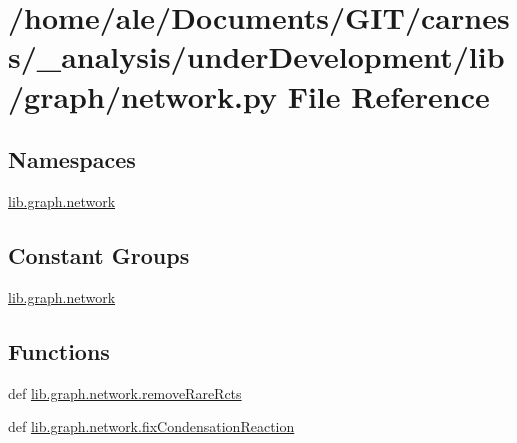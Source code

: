 \hypertarget{a00048}{\section{/home/ale/\-Documents/\-G\-I\-T/carness/\-\_\-analysis/under\-Development/lib/graph/network.py File Reference}
\label{a00048}
}
\subsection*{Namespaces}
\begin{DoxyCompactItemize}
\item 
\hyperlink{a00106}{lib.\-graph.\-network}
\end{DoxyCompactItemize}
\subsection*{Constant Groups}
\begin{DoxyCompactItemize}
\item 
\hyperlink{a00106}{lib.\-graph.\-network}
\end{DoxyCompactItemize}
\subsection*{Functions}
\begin{DoxyCompactItemize}
\item 
def \hyperlink{a00106_aa023644e6dad3ed7be55a592d8576007}{lib.\-graph.\-network.\-remove\-Rare\-Rcts}
\item 
def \hyperlink{a00106_a31099e87728bb8b899360bb641bb6b64}{lib.\-graph.\-network.\-fix\-Condensation\-Reaction}
\end{DoxyCompactItemize}
